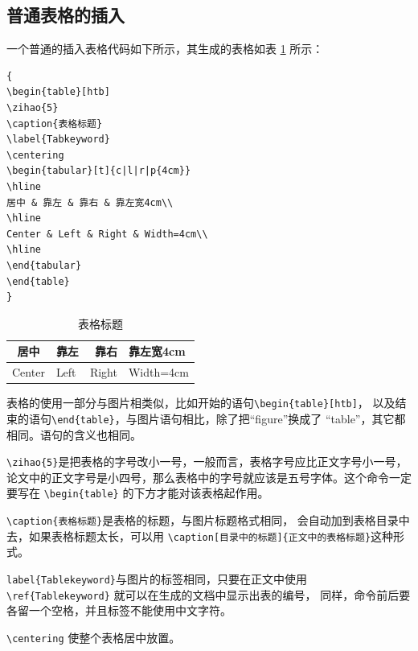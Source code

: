 \subsection{普通表格的插入}

一个普通的插入表格代码如下所示，其生成的表格如表 \ref{Tabkeyword} 所示：

{
\linespread{1}
\noindent
\begin{verbatim}
{
\begin{table}[htb]
\zihao{5}
\caption{表格标题}
\label{Tabkeyword}
\centering
\begin{tabular}[t]{c|l|r|p{4cm}}
\hline
居中 & 靠左 & 靠右 & 靠左宽4cm\\
\hline
Center & Left & Right & Width=4cm\\
\hline
\end{tabular}
\end{table}
}
\end{verbatim}
}

\begin{table}[htb]
\caption{表格标题}
\label{Tabkeyword}
\centering
\begin{tabular}[t]{c|l|r|p{4cm}}
\hline
居中 & 靠左 & 靠右 & 靠左宽4cm\\
\hline
Center & Left & Right & Width=4cm\\
\hline
\end{tabular}
\end{table}

表格的使用一部分与图片相类似，比如开始的语句\verb+\begin{table}[htb]+，
以及结束的语句\verb+\end{table}+，与图片语句相比，除了把“figure”换成了
“table”，其它都相同。语句的含义也相同。

\verb+\zihao{5}+是把表格的字号改小一号，一般而言，表格字号应比正文字号小一号，
论文中的正文字号是小四号，那么表格中的字号就应该是五号字体。这个命令一定要写在
\verb+\begin{table}+ 的下方才能对该表格起作用。

\verb+\caption{表格标题}+是表格的标题，与图片标题格式相同，
会自动加到表格目录中去，如果表格标题太长，可以用
\verb+\caption[目录中的标题]{正文中的表格标题}+这种形式。

\verb+label{Tablekeyword}+与图片的标签相同，只要在正文中使用\\
\verb+\ref{Tablekeyword}+ 就可以在生成的文档中显示出表的编号，
同样，命令前后要各留一个空格，并且标签不能使用中文字符。

\verb+\centering+ 使整个表格居中放置。

